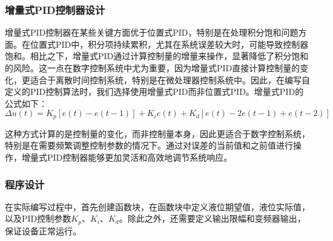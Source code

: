\documentclass[UTF8]{article}
\begin{document}
\subsubsection{增量式PID控制器设计}
增量式PID控制器在某些关键方面优于位置式PID，特别是在处理积分饱和问题方面。在位置式PID中，积分项持续累积，尤其在系统误差较大时，可能导致控制器饱和。相比之下，增量式PID通过计算控制量的增量来操作，显著降低了积分饱和的风险。这一点在数字控制系统中尤为重要，因为增量式PID直接计算控制量的变化，更适合于离散时间控制系统，特别是在微处理器控制系统中。因此，在编写自定义的PID控制算法时，我们选择使用增量式PID而非位置式PID。增量式PID的公式如下：
\begin{equation*}
	\Delta u(t) = K_p[e(t) - e(t-1)] + K_ie(t) + K_d[e(t) - 2e(t-1) + e(t-2)]
\end{equation*}

这种方式计算的是控制量的变化，而非控制量本身，因此更适合于数字控制系统，特别是在需要频繁调整控制参数的情况下。通过对误差的当前值和之前值进行操作，增量式PID控制器能够更加灵活和高效地调节系统响应。

\subsubsection{程序设计}
在实际编写过程中，首先创建函数块，在函数块中定义液位期望值，液位实际值，以及PID控制参数$K_p$、$K_i$、$K_d$。除此之外，还需要定义输出限幅和变频器输出，保证设备正常运行。
\end{document}
